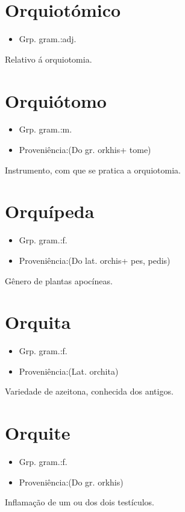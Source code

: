 \section{Orquiotómico}
\begin{itemize}
\item {Grp. gram.:adj.}
\end{itemize}
Relativo á orquiotomia.
\section{Orquiótomo}
\begin{itemize}
\item {Grp. gram.:m.}
\end{itemize}
\begin{itemize}
\item {Proveniência:(Do gr. \textunderscore orkhis\textunderscore  + \textunderscore tome\textunderscore )}
\end{itemize}
Instrumento, com que se pratica a orquiotomia.
\section{Orquípeda}
\begin{itemize}
\item {Grp. gram.:f.}
\end{itemize}
\begin{itemize}
\item {Proveniência:(Do lat. \textunderscore orchis\textunderscore  + \textunderscore pes\textunderscore , \textunderscore pedis\textunderscore )}
\end{itemize}
Gênero de plantas apocíneas.
\section{Orquita}
\begin{itemize}
\item {Grp. gram.:f.}
\end{itemize}
\begin{itemize}
\item {Proveniência:(Lat. \textunderscore orchita\textunderscore )}
\end{itemize}
Variedade de azeitona, conhecida dos antigos.
\section{Orquite}
\begin{itemize}
\item {Grp. gram.:f.}
\end{itemize}
\begin{itemize}
\item {Proveniência:(Do gr. \textunderscore orkhis\textunderscore )}
\end{itemize}
Inflamação de um ou dos dois testículos.
